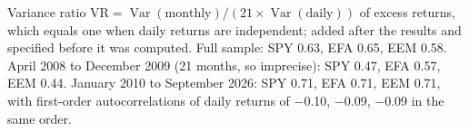 Variance ratio $\mathrm{VR} = \operatorname{Var}(\text{monthly})/(21 \times \operatorname{Var}(\text{daily}))$ of excess returns, which equals one when daily returns are independent; added after the results and specified before it was computed. Full sample: SPY 0.63, EFA 0.65, EEM 0.58. April 2008 to December 2009 (21 months, so imprecise): SPY 0.47, EFA 0.57, EEM 0.44. January 2010 to September 2026: SPY 0.71, EFA 0.71, EEM 0.71, with first-order autocorrelations of daily returns of $-$0.10, $-$0.09, $-$0.09 in the same order.
